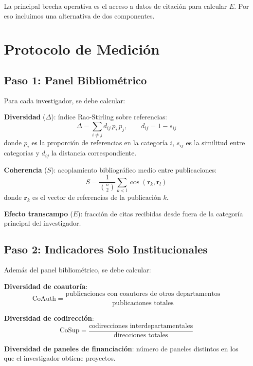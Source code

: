 \documentclass[
]{article}
\begin{document}
La principal brecha operativa es el acceso a datos de citación para
calcular \(E\). Por eso incluimos una alternativa de dos componentes.

\hypertarget{protocolo-de-mediciuxf3n}{%
\section{Protocolo de Medición}\label{protocolo-de-mediciuxf3n}}

\hypertarget{paso-1-panel-bibliomuxe9trico}{%
\subsection{Paso 1: Panel
Bibliométrico}\label{paso-1-panel-bibliomuxe9trico}}

Para cada investigador, se debe calcular:

\textbf{Diversidad} (\(\Delta\)): índice Rao-Stirling sobre referencias:
\[\Delta = \sum_{i \neq j} d_{ij}\, p_i\, p_j, \qquad d_{ij} = 1 - s_{ij}\]
donde \(p_i\) es la proporción de referencias en la categoría \(i\),
\(s_{ij}\) es la similitud entre categorías y \(d_{ij}\) la distancia
correspondiente.

\textbf{Coherencia} (\(S\)): acoplamiento bibliográfico medio entre
publicaciones:
\[S = \frac{1}{\binom{n}{2}} \sum_{k < l} \cos(\mathbf{r}_k, \mathbf{r}_l)\]
donde \(\mathbf{r}_k\) es el vector de referencias de la publicación
\(k\).

\textbf{Efecto transcampo} (\(E\)): fracción de citas recibidas desde
fuera de la categoría principal del investigador.

\hypertarget{paso-2-indicadores-solo-institucionales}{%
\subsection{Paso 2: Indicadores Solo
Institucionales}\label{paso-2-indicadores-solo-institucionales}}

Además del panel bibliométrico, se debe calcular:

\textbf{Diversidad de coautoría}:
\[\text{CoAuth} = \frac{\text{publicaciones con coautores de otros departamentos}}{\text{publicaciones totales}}\]

\textbf{Diversidad de codirección}:
\[\text{CoSup} = \frac{\text{codirecciones interdepartamentales}}{\text{direcciones totales}}\]

\textbf{Diversidad de paneles de financiación}: número de paneles
distintos en los que el investigador obtiene proyectos.
\end{document}
